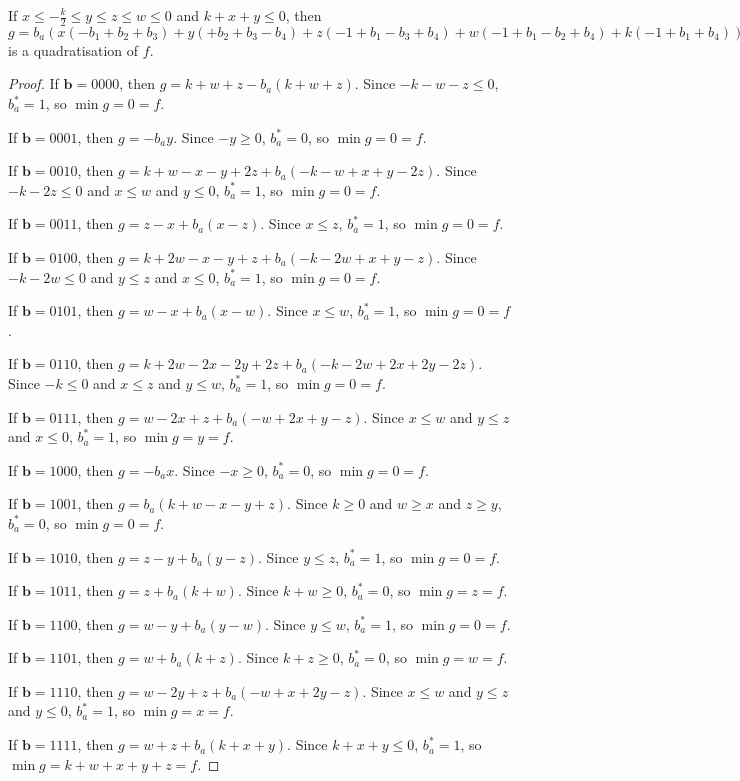 \documentclass[11pt]{scrartcl}
\newcommand{\vc}[1]{\boldsymbol{#1}}
\begin{document}
\begin{lemma}
	\label{case2}
 If $x \le -\frac{k}{2} \le y \le z \le w \le 0$ and $k+x+y \le 0$, then $g = b_a(x(-b_1+b_2+b_3)+y(+b_2+b_3-b_4)+z(-1+b_1-b_3+b_4)+w(-1+b_1-b_2+b_4)+k(-1+b_1+b_4))+x(-b_2-b_3+b_1b_2+b_1b_3)+y(-b_2-b_3+b_2b_4+b_3b_4)+z(+1 -b_1+b_3-b_4+b_1b_4)+w(+1 -b_1+b_2-b_4+b_1b_4)+k(+1 -b_1-b_4+b_1b_4)$ is a quadratisation of $f$.
 \end{lemma}

\begin{proof}
If $\vc b = 0000$, then $g = k + w + z - b_a(k + w + z)$.
Since $-k - w - z \le 0$, $b_a^* = 1$, so $\min g = 0 = f$.

If $\vc b = 0001$, then $g = -b_ay$.
Since $-y \ge 0$, $b_a^* = 0 $, so $\min g = 0 = f$.

If $\vc b = 0010$, then $g = k + w - x - y + 2z + b_a(-k - w + x + y - 2z)$.
Since $-k - 2z \le 0$ and $x \le w$ and $ y \le 0$, $b_a^* = 1$, so $\min g = 0 = f$.

If $\vc b = 0011$, then $g = z - x + b_a(x - z)$.
Since $x \le z$, $b_a^* = 1$, so $\min g = 0 = f$.

If $\vc b = 0100$, then $g = k + 2w - x - y + z + b_a(-k - 2w + x + y - z)$.
Since $-k - 2w \le 0$ and $y \le z$ and $x \le 0$, $b_a^* = 1$, so $\min g = 0 = f$.

If $\vc b = 0101$, then $g = w - x + b_a(x - w)$.
Since $x \le w$, $b_a^* = 1$, so $\min g = 0 = f$.

If $\vc b = 0110$, then $g = k + 2w - 2x - 2y + 2z + b_a(-k -2w + 2x + 2y - 2z)$.
Since $-k \le 0$ and $x \le z$ and $y \le w$, $b_a^* = 1$, so $\min g = 0 = f$.

If $\vc b = 0111$, then $g = w - 2x + z + b_a(-w + 2x + y - z)$.
Since $x \le w$ and $y \le z$ and $x \le 0$, $b_a^* = 1$, so $\min g = y = f$.

If $\vc b = 1000$, then $g = -b_ax$.
Since $-x \ge 0$, $b_a^* = 0$, so $\min g = 0 = f$.

If $\vc b = 1001$, then $g = b_a(k + w - x - y + z)$.
Since $k \ge 0$ and $w \ge x $ and $z \ge y$, $b_a^* = 0$, so $\min g = 0 = f$.

If $\vc b = 1010$, then $g = z - y + b_a(y - z)$.
Since $y \le z$, $b_a^* = 1$, so $\min g = 0 = f$.

If $\vc b = 1011$, then $g = z + b_a(k + w)$.
Since $k + w \ge 0$, $b_a^* = 0$, so $\min g = z = f$.

If $\vc b = 1100$, then $g = w - y + b_a(y -w)$.
Since $y \le w$, $b_a^* = 1$, so $\min g = 0 = f$.

If $\vc b = 1101$, then $g = w + b_a(k + z)$.
Since $k+z \ge 0$, $b_a^* = 0 $, so $\min g = w = f$.

If $\vc b = 1110$, then $g = w - 2y + z + b_a(-w + x + 2y - z)$.
Since $x \le w$ and $ y \le z$ and $y \le 0$, $b_a^* = 1$, so $\min g = x =f $.

If $\vc b = 1111$, then $g = w + z + b_a(k + x + y)$.
Since $k+x + y \le 0$, $b_a^* = 1$, so $\min g = k + w + x + y + z = f$.
\end{proof}
\end{document}
